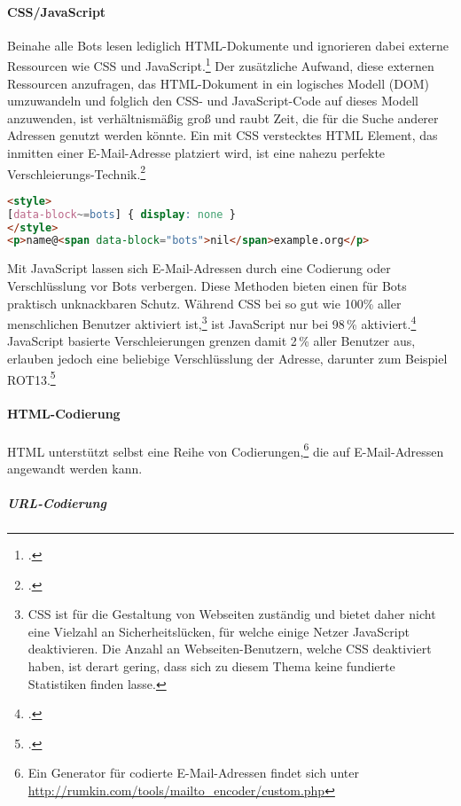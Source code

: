 \paragraph{CSS/JavaScript}
\label{par:cssjavascript}

Beinahe alle Bots lesen lediglich HTML-Dokumente und ignorieren dabei externe
Ressourcen wie CSS und JavaScript.\footcite{hideEmailAddress} Der zusätzliche
Aufwand, diese externen Ressourcen anzufragen, das HTML-Dokument in ein
logisches Modell (DOM) umzuwandeln und folglich den CSS- und JavaScript-Code
auf dieses Modell anzuwenden, ist verhältnismäßig groß und raubt Zeit, die für
die Suche anderer Adressen genutzt werden könnte. Ein mit CSS verstecktes HTML
Element, das inmitten einer E-Mail-Adresse platziert wird, ist eine nahezu
perfekte Verschleierungs-Technik.\footcite{obfuscateEmailAddresses}

\begin{lstlisting}[language=HTML]
<style>
[data-block~=bots] { display: none }
</style>
<p>name@<span data-block="bots">nil</span>example.org</p>
\end{lstlisting}

Mit JavaScript lassen sich E-Mail-Adressen durch eine Codierung oder
Verschlüsslung vor Bots verbergen. Diese Methoden bieten einen für Bots
praktisch unknackbaren Schutz. Während CSS bei so gut wie 100\% aller
menschlichen Benutzer aktiviert ist,\footnote{CSS ist für die Gestaltung von
Webseiten zuständig und bietet daher nicht eine Vielzahl an Sicherheitslücken,
für welche einige Netzer JavaScript deaktivieren. Die Anzahl an
Webseiten-Benutzern, welche CSS deaktiviert haben, ist derart gering, dass sich
zu diesem Thema keine fundierte Statistiken finden lasse.} ist JavaScript nur
bei 98\,\% aktiviert.\footcite{javaScriptDisableStats} JavaScript basierte
Verschleierungen grenzen damit 2\,\% aller Benutzer aus, erlauben jedoch eine
beliebige Verschlüsslung der Adresse, darunter zum Beispiel
ROT13.\footcite{modernCryptanalysis}

\paragraph{HTML-Codierung}
\label{par:html-codierung}

HTML unterstützt selbst eine Reihe von Codierungen,\footnote{Ein Generator für
codierte E-Mail-Adressen findet sich unter
\url{http://rumkin.com/tools/mailto_encoder/custom.php}} die auf
E-Mail-Adressen angewandt werden kann.

\subparagraph{URL-Codierung}
\label{spar:url-codierung}

